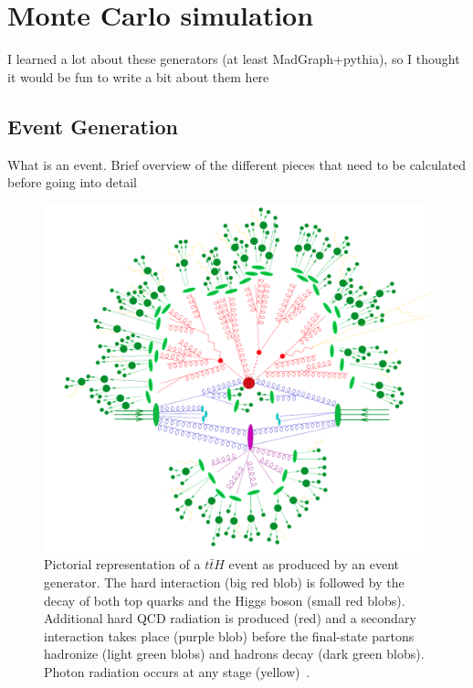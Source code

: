 \chapter[Monte Carlo simulation][Monte Carlo simulation]{Monte Carlo simulation}
\label{ch:mc}

{\color{red} I learned a lot about these generators (at least MadGraph+pythia),
  so I thought it would be fun to write a bit about them here}

\section{Event Generation}

{\color{red} What is an event. Brief overview of the different pieces that need
  to be calculated before going into detail}

  \begin{figure}[p]
    \centering
    \includegraphics[width=\textwidth, clip=true, trim=0 0 0 0]
    {figs/mc_gen/full_mc_event.png}
    \caption[
      Pictorial representation of a $t\bar{t}H$ event as produced by an event
      generator~\cite{Gleisberg:2008ta}.
    ]{
      Pictorial representation of a $t\bar{t}H$ event as produced by an event
      generator.
      The hard interaction (big red blob) is followed by the decay of both top
      quarks and the Higgs boson (small red blobs).
      Additional hard QCD radiation is produced (red) and a secondary
      interaction takes place (purple blob) before the final-state partons
      hadronize (light green blobs) and hadrons decay (dark green blobs).
      Photon radiation occurs at any stage (yellow)~\cite{Gleisberg:2008ta}.
    }
    \label{fig:mc_event}
\end{figure}


